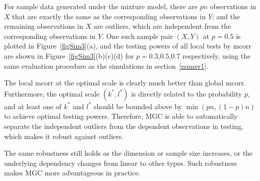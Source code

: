 \documentclass[11pt]{article}
\begin{document}
For sample data generated under the mixture model, there are $pn$ observations in $X$ that are exactly the same as the corresponding observations in $Y$; and the remaining observations in $X$ are outliers, which are independent from the corresponding observations in $Y$. One such sample pair $(X,Y)$ at $p=0.5$ is plotted in Figure~\ref{figSim3}(a), and the testing powers of all local tests by mcorr are shown in Figure~\ref{figSim3}(b)(c)(d) for $p=0.3$,$0.5$,$0.7$ respectively, using the same evaluation procedure as the simulations in section~\ref{numer1}.

The local mcorr at the optimal scale is clearly much better than global mcorr. Furthermore, the optimal scale $(k^{*},l^{*})$ is directly related to the probability $p$, and at least one of $k^{*}$ and $l^{*}$ should be bounded above by $\min(pn,(1-p)n)$ to achieve optimal testing powers. Therefore, MGC is able to automatically separate the independent outliers from the dependent observations in testing, which makes it robust against outliers.

The same robustness still holds as the dimension or sample size increases, or the underlying dependency changes from linear to other types. Such robustness makes MGC more advantageous in practice. 
\end{document}
